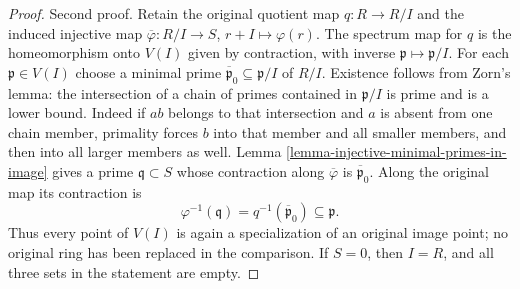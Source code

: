 \begin{proof}
\medskip\noindent
Second proof. Retain the original quotient map
$q:R\to R/I$ and the induced injective map
$\overline\varphi:R/I\to S$, $r+I\mapsto\varphi(r)$.
The spectrum map for $q$ is the homeomorphism onto
$V(I)$ given by contraction, with inverse
$\mathfrak p\mapsto\mathfrak p/I$.
For each $\mathfrak p\in V(I)$ choose a minimal prime
$\overline{\mathfrak p}_0\subseteq\mathfrak p/I$
of $R/I$. Existence follows from Zorn's lemma: the
intersection of a chain of primes contained in
$\mathfrak p/I$ is prime and is a lower bound.
Indeed if $ab$ belongs to that intersection and $a$
is absent from one chain member, primality forces
$b$ into that member and all smaller members, and
then into all larger members as well.
Lemma \ref{lemma-injective-minimal-primes-in-image}
gives a prime $\mathfrak q\subset S$ whose contraction
along $\overline\varphi$ is $\overline{\mathfrak p}_0$.
Along the original map its contraction is
$$
\varphi^{-1}(\mathfrak q)
=q^{-1}(\overline{\mathfrak p}_0)\subseteq\mathfrak p.
$$
Thus every point of $V(I)$ is again a specialization
of an original image point; no original ring has been
replaced in the comparison. If $S=0$, then $I=R$,
and all three sets in the statement are empty.
\end{proof}
